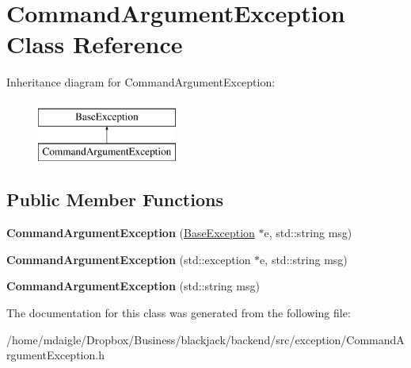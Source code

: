 \hypertarget{classCommandArgumentException}{
\section{\-Command\-Argument\-Exception \-Class \-Reference}
\label{classCommandArgumentException}
}
\-Inheritance diagram for \-Command\-Argument\-Exception\-:\begin{figure}[H]
\begin{center}
\leavevmode
\includegraphics[height=2.000000cm]{classCommandArgumentException}
\end{center}
\end{figure}
\subsection*{\-Public \-Member \-Functions}
\begin{DoxyCompactItemize}
\item 
\hypertarget{classCommandArgumentException_a90e424ef669a73137dc511bc82355ae2}{
{\bfseries \-Command\-Argument\-Exception} (\hyperlink{classBaseException}{\-Base\-Exception} $\ast$e, std\-::string msg)}
\label{classCommandArgumentException_a90e424ef669a73137dc511bc82355ae2}

\item 
\hypertarget{classCommandArgumentException_a898cf3210cb20f97a1b8a4d34baa5a2d}{
{\bfseries \-Command\-Argument\-Exception} (std\-::exception $\ast$e, std\-::string msg)}
\label{classCommandArgumentException_a898cf3210cb20f97a1b8a4d34baa5a2d}

\item 
\hypertarget{classCommandArgumentException_a141078ae4266039763d46b4559386652}{
{\bfseries \-Command\-Argument\-Exception} (std\-::string msg)}
\label{classCommandArgumentException_a141078ae4266039763d46b4559386652}

\end{DoxyCompactItemize}


\-The documentation for this class was generated from the following file\-:\begin{DoxyCompactItemize}
\item 
/home/mdaigle/\-Dropbox/\-Business/blackjack/backend/src/exception/\-Command\-Argument\-Exception.\-h\end{DoxyCompactItemize}
